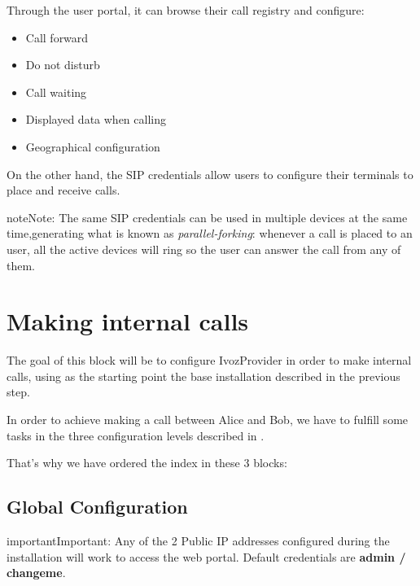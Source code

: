 \documentclass[letterpaper,10pt,english]{sphinxmanual}
\begin{document}
Through the user portal, it can browse their call registry and configure:
\begin{itemize}
\item {} 
Call forward

\item {} 
Do not disturb

\item {} 
Call waiting

\item {} 
Displayed data when calling

\item {} 
Geographical configuration

\end{itemize}

On the other hand, the SIP credentials allow users to configure their terminals to place and receive calls.

\begin{notice}{note}{Note:}
The same SIP credentials can be used in multiple devices at the same
time,generating what is known as \emph{parallel-forking}: whenever a call is
placed to an user, all the active devices will ring so the user can
answer the call from any of them.
\end{notice}


\chapter{Making internal calls}
\label{getting_started/internal_calls/index:making-internal-calls}\label{getting_started/internal_calls/index::doc}
The goal of this block will be to configure IvozProvider in order to make
internal calls, using as the starting point the base installation described
in the previous step.

In order to achieve making a call between Alice and Bob, we have to fulfill some tasks in
the three configuration levels described in {\hyperref[basic_concepts/operation_roles/index:operation\string-roles]{}}.

That's why we have ordered the index in these 3 blocks:


\section{Global Configuration}
\label{getting_started/internal_calls/god_portal:global-configuration}\label{getting_started/internal_calls/god_portal::doc}
\begin{notice}{important}{Important:}
Any of the 2 Public IP addresses configured during the
installation will work to access the web portal. Default credentials are
\textbf{admin / changeme}.
\end{notice}
\end{document}

